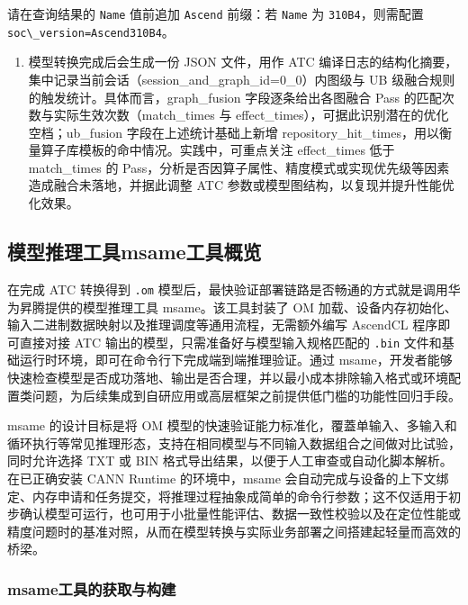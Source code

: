 请在查询结果的 \passthrough{\lstinline!Name!} 值前追加
\passthrough{\lstinline!Ascend!} 前缀：若 \passthrough{\lstinline!Name!}
为 \passthrough{\lstinline!310B4!}，则需配置
\passthrough{\lstinline!soc\_version=Ascend310B4!}。

\begin{enumerate}
\def\labelenumi{\arabic{enumi}.}
\setcounter{enumi}{2}
\tightlist
\item
  模型转换完成后会生成一份 JSON 文件，用作 ATC
  编译日志的结构化摘要，集中记录当前会话（session\_and\_graph\_id=0\_0）内图级与
  UB 级融合规则的触发统计。具体而言，graph\_fusion 字段逐条给出各图融合
  Pass 的匹配次数与实际生效次数（match\_times 与
  effect\_times），可据此识别潜在的优化空档；ub\_fusion
  字段在上述统计基础上新增
  repository\_hit\_times，用以衡量算子库模板的命中情况。实践中，可重点关注
  effect\_times 低于 match\_times 的
  Pass，分析是否因算子属性、精度模式或实现优先级等因素造成融合未落地，并据此调整
  ATC 参数或模型图结构，以复现并提升性能优化效果。
\end{enumerate}

\subsection{模型推理工具msame工具概览}\label{src-book-chapter2-h14}

在完成 ATC 转换得到 \passthrough{\lstinline!.om!}
模型后，最快验证部署链路是否畅通的方式就是调用华为昇腾提供的模型推理工具
msame。该工具封装了 OM
加载、设备内存初始化、输入二进制数据映射以及推理调度等通用流程，无需额外编写
AscendCL 程序即可直接对接 ATC 输出的模型，只需准备好与模型输入规格匹配的
\passthrough{\lstinline!.bin!}
文件和基础运行时环境，即可在命令行下完成端到端推理验证。通过
msame，开发者能够快速检查模型是否成功落地、输出是否合理，并以最小成本排除输入格式或环境配置类问题，为后续集成到自研应用或高层框架之前提供低门槛的功能性回归手段。

msame 的设计目标是将 OM
模型的快速验证能力标准化，覆蓋单输入、多输入和循环执行等常见推理形态，支持在相同模型与不同输入数据组合之间做对比试验，同时允许选择
TXT 或 BIN 格式导出结果，以便于人工审查或自动化脚本解析。在已正确安装
CANN Runtime 的环境中，msame
会自动完成与设备的上下文绑定、内存申请和任务提交，将推理过程抽象成简单的命令行参数；这不仅适用于初步确认模型可运行，也可用于小批量性能评估、数据一致性校验以及在定位性能或精度问题时的基准对照，从而在模型转换与实际业务部署之间搭建起轻量而高效的桥梁。

\subsubsection{msame工具的获取与构建}\label{src-book-chapter2-h15}

